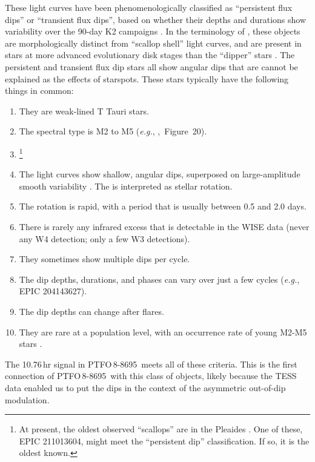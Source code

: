 \documentclass[12pt,twocolumn,tighten,trackchanges]{aastex62}
\newcommand{\ptfo}{PTFO$\,$8-8695}
\begin{document}
These light curves have been phenomenologically classified as
``persistent flux dips'' or ``transient flux dips'', based on whether
their depths and durations show variability over the 90-day K2
campaigns \citep{stauffer_orbiting_2017}.  In the terminology of
\citet{stauffer_orbiting_2017}, these objects are morphologically
distinct from ``scallop shell'' light curves, and are present in stars
at more advanced evolutionary disk stages than the ``dipper'' stars
\citep{ansdell_young_2016,bodman_dippers_2017,cody_manyfaceted_2018}.
The persistent and transient flux dip stars all show angular dips that
are cannot be explained as the effects of starspots.  These stars
typically have the following things in common:
\begin{enumerate}[topsep=0.5ex,itemsep=-0.5ex,partopsep=1ex,parsep=1.5ex]
  \item They are weak-lined T Tauri stars.
  \item The spectral type is M2 to M5 ({\it e.g.},
    \citealt{rebull_usco_2018},~Figure~20).
  \item {}\footnote{ At
    present, the oldest observed ``scallops'' are in the Pleaides
    \citep{rebull_rotation_2016}. One of these, EPIC 211013604, might
    meet the ``persistent dip'' classification.  If so, it is  the
    oldest known. } 
  \item The light curves show shallow, angular dips, 
    superposed on large-amplitude smooth variability . The  is
    interpreted as stellar rotation.
  \item The rotation is rapid, with a period that is usually between
    0.5 and 2.0 days.
  \item There is rarely any infrared excess that is detectable in the
    WISE data (never any W4 detection; only a few W3 detections).
  \item They sometimes show multiple dips per cycle.
  \item The dip depths, durations, and phases can vary over just a few
    cycles ({\it e.g.}, EPIC 204143627).
  \item The dip depths can change after flares.
  \item They are rare at a population level, with an occurrence rate
   of young M2-M5 stars \citep{rebull_usco_2018}.
\end{enumerate}
The 10.76$\,$hr signal in \ptfo\ meets all of these criteria.  This is
the first connection of \ptfo\ with this class of objects, likely
because the TESS data enabled us to put the dips in the context of the
asymmetric out-of-dip modulation.
\end{document}
